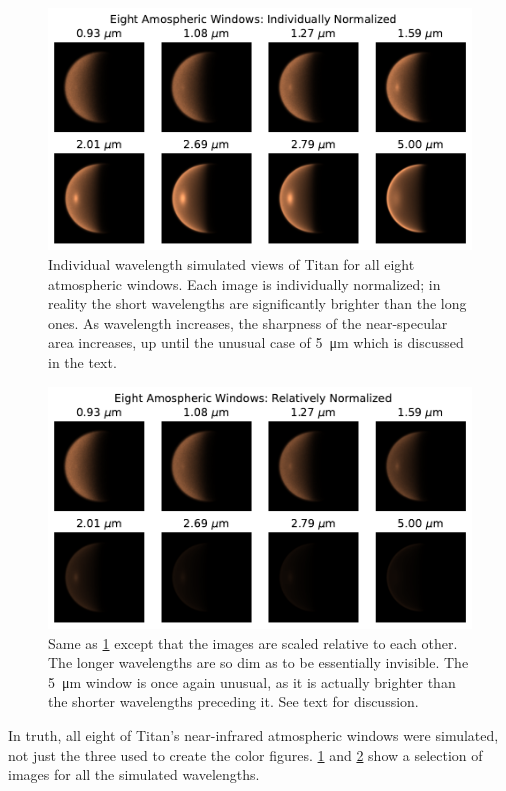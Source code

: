 \documentclass{article}
\begin{document}
\begin{figure}[htbp]
\includegraphics[scale = 0.7]{8WindowsNorm.pdf}
\centering
\caption{Individual wavelength simulated views of Titan for all eight atmospheric windows. Each image is individually normalized; in reality the short wavelengths are significantly brighter than the long ones. As wavelength increases, the sharpness of the near-specular area increases, up until the unusual case of \qty{5}{\micro\meter} which is discussed in the text.}
\label{fig:7}
\end{figure}
\begin{figure}[htbp]
\includegraphics[scale = 0.7]{8WindowsNoNorm.pdf}
\centering
\caption{Same as \ref{fig:7} except that the images are scaled relative to each other. The longer wavelengths are so dim as to be essentially invisible. The \qty{5}{\micro\meter} window is once again unusual, as it is actually brighter than the shorter wavelengths preceding it. See text for discussion.}
\label{fig:8}
\end{figure}

In truth, all eight of Titan's near-infrared atmospheric windows were simulated, not just the three used to create the color figures. \ref{fig:7} and \ref{fig:8} show a selection of images for all the simulated wavelengths.
\end{document}
